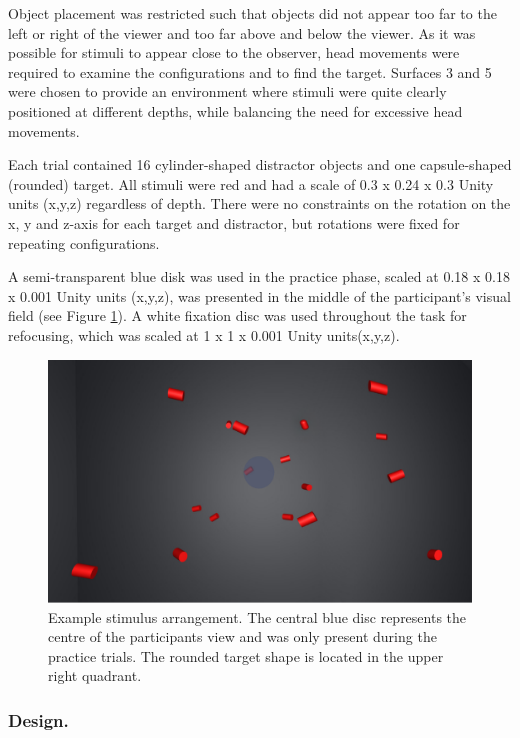 \documentclass[
  english,
  man,floatsintext]{apa7}
\begin{document}
Object placement was restricted such that objects did not appear too far to the left or right of the viewer and too far above and below the viewer. As it was possible for stimuli to appear close to the observer, head movements were required to examine the configurations and to find the target. Surfaces 3 and 5 were chosen to provide an environment where stimuli were quite clearly positioned at different depths, while balancing the need for excessive head movements.

Each trial contained 16 cylinder-shaped distractor objects and one capsule-shaped (rounded) target. All stimuli were red and had a scale of 0.3 x 0.24 x 0.3 Unity units (x,y,z) regardless of depth. There were no constraints on the rotation on the x, y and z-axis for each target and distractor, but rotations were fixed for repeating configurations.

A semi-transparent blue disk was used in the practice phase, scaled at 0.18 x 0.18 x 0.001 Unity units (x,y,z), was presented in the middle of the participant's visual field (see Figure \ref{fig:task-example}). A white fixation disc was used throughout the task for refocusing, which was scaled at 1 x 1 x 0.001 Unity units(x,y,z).



\begin{figure}

{\centering \includegraphics[width=0.6\linewidth]{fig_ExampleVR} 

}

\caption{Example stimulus arrangement. The central blue disc represents the centre of the participants view and was only present during the practice trials. The rounded target shape is located in the upper right quadrant.}\label{fig:task-example}
\end{figure}

\hypertarget{design.}{%
\subsubsection{Design.}\label{design.}}
\end{document}
